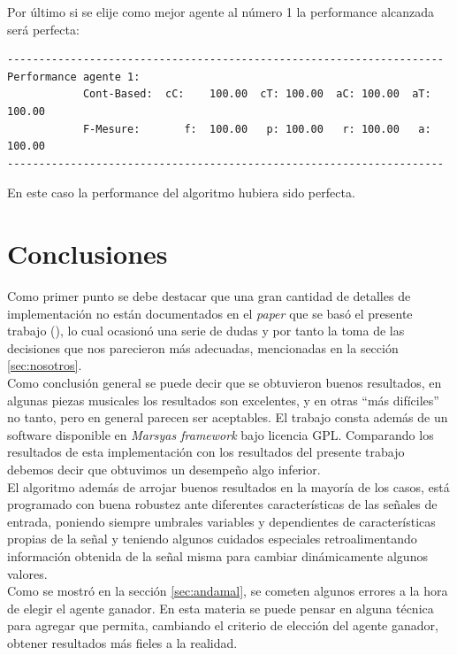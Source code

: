 \documentclass[12pt,a4paper,titlepage]{report}
\begin{document}
Por último si se elije como mejor agente al número 1 la performance alcanzada será perfecta:
\begin{verbatim}
---------------------------------------------------------------------
Performance agente 1:
        	Cont-Based:	 cC:	100.00	cT:	100.00	aC:	100.00	aT:	100.00
        	F-Mesure:	    f:	100.00	 p:	100.00	 r:	100.00	 a:	100.00
---------------------------------------------------------------------
\end{verbatim}

En este caso la performance del algoritmo hubiera sido perfecta.


\section{Conclusiones}

Como primer punto se debe destacar que una gran cantidad de detalles de implementación no están documentados en el \emph{paper} que se basó el presente trabajo (\cite{bib:el_posta}), lo cual ocasionó una serie de dudas y  por tanto la toma de las decisiones que nos parecieron más adecuadas, mencionadas en la sección \ref{sec:nosotros}.\\

Como conclusión general se puede decir que se obtuvieron buenos resultados, en algunas piezas musicales los resultados son excelentes, y en otras ``más difíciles'' no tanto, pero en general parecen ser aceptables. El trabajo \cite{bib:el_posta} consta además de un software disponible en \emph{Marsyas framework} bajo licencia GPL. Comparando los resultados de esta implementación con los resultados del presente trabajo debemos decir que obtuvimos un desempeño algo inferior.\\

El algoritmo además de arrojar buenos resultados en la mayoría de los casos, está programado con buena robustez ante diferentes características de las señales de entrada, poniendo siempre umbrales variables y dependientes de características propias de la señal y teniendo algunos cuidados especiales retroalimentando información obtenida de la señal misma para cambiar dinámicamente algunos valores.\\

Como se mostró en la sección \ref{sec:andamal}, se cometen algunos errores a la hora de elegir el agente ganador. En esta materia se puede pensar en alguna técnica para agregar que permita, cambiando el criterio de elección del agente ganador, obtener resultados más fieles a la realidad.\\
\end{document}
